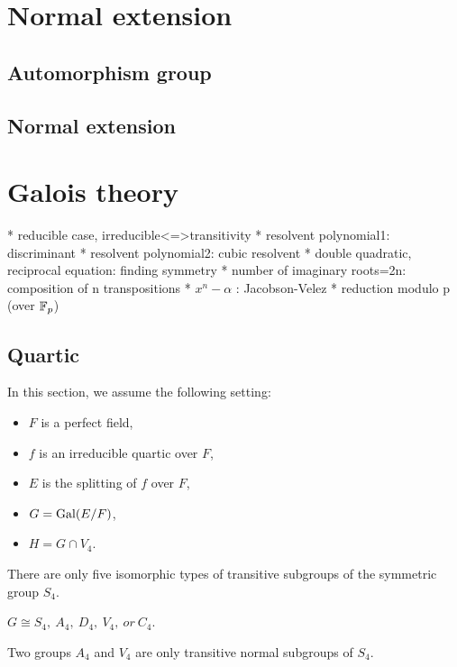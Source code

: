 \documentclass{../exp}
\begin{document}
\section{Normal extension}
\subsection{Automorphism group}

\subsection{Normal extension}









\section{Galois theory}

 * reducible case, irreducible<=>transitivity
 * resolvent polynomial1: discriminant
 * resolvent polynomial2: cubic resolvent
 * double quadratic, reciprocal equation: finding symmetry
 * number of imaginary roots=2n: composition of n transpositions
 * $x^n-\alpha$ :  Jacobson-Velez
 * reduction modulo p (over $\mathbb{F}_p$)

\subsection{Quartic}
In this section, we assume the following setting:
\begin{itemize}
\item $F$ is a perfect field, %
\item $f$ is an irreducible quartic over $F$,
\item $E$ is the splitting of $f$ over $F$,
\item $G=\operatorname{Gal}(E/F)$,
\item $H=G\cap V_4$. 
\end{itemize}
\begin{thm}
There are only five isomorphic types of transitive subgroups of the symmetric group $S_4$.
\end{thm}
\begin{cor}
$G\cong S_4,\ A_4,\ D_4,\ V_4,\ or\ C_4$.
\end{cor}
\begin{prop}
Two groups $A_4$ and $V_4$ are only transitive normal subgroups of $S_4$.
\end{prop}
\end{document}
